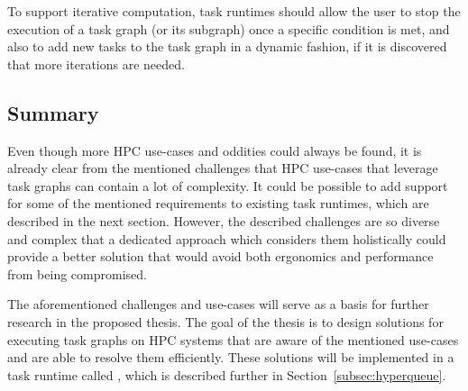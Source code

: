 To support iterative computation, task runtimes should allow the user to stop the execution of a
task graph (or its subgraph) once a specific condition is met, and also to add new tasks to the
task graph in a dynamic fashion, if it is discovered that more iterations are needed.

\subsection{Summary}
Even though more HPC use-cases and oddities could always be found, it is already clear from the
mentioned challenges that HPC use-cases that leverage task graphs can contain a lot of complexity.
It could be possible to add support for some of the mentioned requirements to existing task
runtimes, which are described in the next section. However, the described challenges are so
diverse and complex that a dedicated approach which considers them holistically could provide a
better solution that would avoid both ergonomics and performance from being compromised.

The aforementioned challenges and use-cases will serve as a basis for further research in the
proposed thesis. The goal of the thesis is to design solutions for executing task graphs on HPC
systems that are aware of the mentioned use-cases and are able to resolve them efficiently.
These solutions will be implemented in a task runtime called \hyperqueue{}, which is described
further in Section~\ref{subsec:hyperqueue}.
